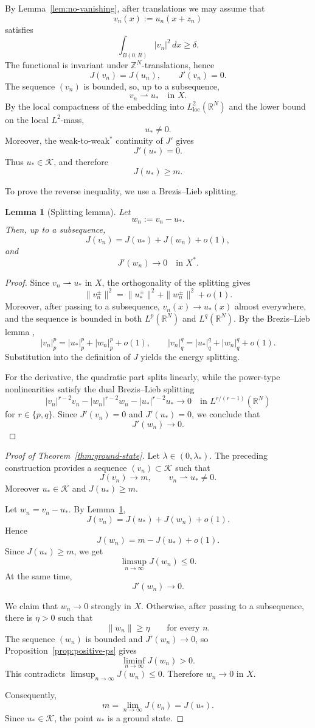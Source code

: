 \documentclass[10pt,a4paper]{amsart}
\numberwithin{equation}{section}
\newtheorem{lemma}[theorem]{Lemma}
\newcommand{\R}{\mathbb{R}}
\newcommand{\Z}{\mathbb{Z}}
\newcommand{\cK}{\mathcal{K}}
\newcommand{\weak}{\rightharpoonup}
\begin{document}
By Lemma~\ref{lem:no-vanishing}, after translations we may assume that
\[
v_n(x):=u_n(x+z_n)
\]
satisfies
\[
\int_{B(0,R)}|v_n|^2\,dx\ge\delta.
\]
The functional is invariant under $\Z^{N}$-translations, hence
\[
J(v_n)=J(u_n),\qquad J'(v_n)=0.
\]
The sequence $(v_n)$ is bounded, so, up to a subsequence,
\[
v_n\weak u_*\quad\text{in }X.
\]
By the local compactness of the embedding into $L^2_{\mathrm{loc}}(\R^N)$ and
the lower bound on the local $L^2$-mass,
\[
u_*\ne0.
\]
Moreover, the weak-to-weak$^*$ continuity of $J'$ gives
\[
J'(u_*)=0.
\]
Thus $u_*\in\cK$, and therefore
\[
J(u_*)\ge m.
\]

To prove the reverse inequality, we use a Brezis--Lieb splitting.

\begin{lemma}[Splitting lemma]\label{lem:splitting}
Let
\[
w_n:=v_n-u_*.
\]
Then, up to a subsequence,
\[
J(v_n)=J(u_*)+J(w_n)+o(1),
\]
and
\[
J'(w_n)\to0\quad\text{in }X^*.
\]
\end{lemma}

\begin{proof}
Since $v_n\weak u_*$ in $X$, the orthogonality of the splitting gives
\[
\|v_n^\pm\|^2=\|u_*^\pm\|^2+\|w_n^\pm\|^2+o(1).
\]
Moreover, after passing to a subsequence, $v_n(x)\to u_*(x)$ almost
everywhere, and the sequence is bounded in both $L^p(\R^N)$ and $L^q(\R^N)$. By the Brezis--Lieb lemma \cite{BrezisLieb},
\[
|v_n|_p^p=|u_*|_p^p+|w_n|_p^p+o(1),
\qquad
|v_n|_q^q=|u_*|_q^q+|w_n|_q^q+o(1).
\]
Substitution into the definition of $J$ yields the energy splitting.

For the derivative, the quadratic part splits linearly, while the
power-type nonlinearities satisfy the dual Brezis--Lieb splitting
\[
|v_n|^{r-2}v_n-|w_n|^{r-2}w_n-|u_*|^{r-2}u_*
\to0
\quad\text{in }L^{r/(r-1)}(\R^N)
\]
for $r\in\{p,q\}$. Since $J'(v_n)=0$ and $J'(u_*)=0$, we conclude that
\[
J'(w_n)\to0.
\]
\end{proof}


\begin{proof}[Proof of Theorem~\ref{thm:ground-state}]
Let $\lambda\in(0,\lambda_*)$. The preceding construction provides a
sequence $(v_n)\subset\cK$ such
that
\[
J(v_n)\to m,\qquad v_n\weak u_*\ne0.
\]
Moreover $u_*\in\cK$ and $J(u_*)\ge m$.

Let $w_n=v_n-u_*$. By Lemma~\ref{lem:splitting},
\[
J(v_n)=J(u_*)+J(w_n)+o(1).
\]
Hence
\[
J(w_n)=m-J(u_*)+o(1).
\]
Since $J(u_*)\ge m$, we get
\[
\limsup_{n\to\infty}J(w_n)\le0.
\]
At the same time,
\[
J'(w_n)\to0.
\]

We claim that $w_n\to0$ strongly in $X$. Otherwise, after passing to a
subsequence, there is $\eta>0$ such that
\[
\|w_n\|\ge\eta
\qquad\text{for every }n.
\]
The sequence $(w_n)$ is bounded and $J'(w_n)\to0$, so Proposition~\ref{prop:positive-ps} gives
\[
\liminf_{n\to\infty}J(w_n)>0.
\]
This contradicts $\limsup_{n\to\infty} J(w_n)\le0$. Therefore $w_n\to0$ in $X$.

Consequently,
\[
m=\lim_{n\to\infty}J(v_n)=J(u_*).
\]
Since $u_*\in\cK$, the point $u_*$ is a ground state.
\end{proof}
\end{document}
